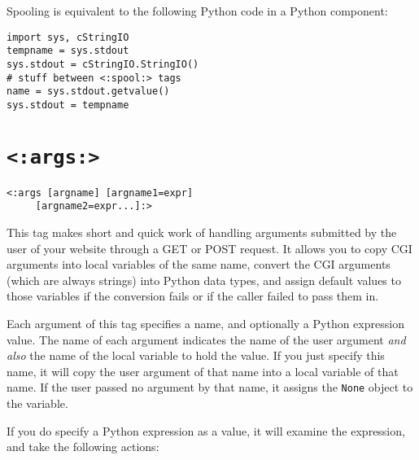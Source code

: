 \documentclass{manual}
\begin{document}
Spooling is equivalent to the following Python code in a Python component:
\begin{verbatim}
import sys, cStringIO
tempname = sys.stdout
sys.stdout = cStringIO.StringIO()
# stuff between <:spool:> tags 
name = sys.stdout.getvalue()
sys.stdout = tempname
\end{verbatim}




\section{\texttt{<:args:>}}
\label{tagargs}

\begin{verbatim}
<:args [argname] [argname1=expr] 
     [argname2=expr...]:>
\end{verbatim}


This tag makes short and quick work of handling arguments
submitted by the user of your website through a GET or POST
request. It allows you to copy CGI arguments into local
variables of the same name, convert the CGI arguments (which
are always strings) into Python data types, and assign default 
values to those variables if the conversion fails or if
the caller failed to pass them in.

Each argument of this tag specifies a name, and optionally
a Python expression value. The name of each argument indicates
the name of the user argument \emph{and also} the name of 
the local variable to hold the value. If you just specify this
name, it will copy the user argument of that name
into a local variable of that name. If the user passed no argument
by that name, it assigns the \texttt{None} object
to the variable.

If you do specify a Python expression as a value, it
will examine the expression, and take the following actions:
\end{document}
